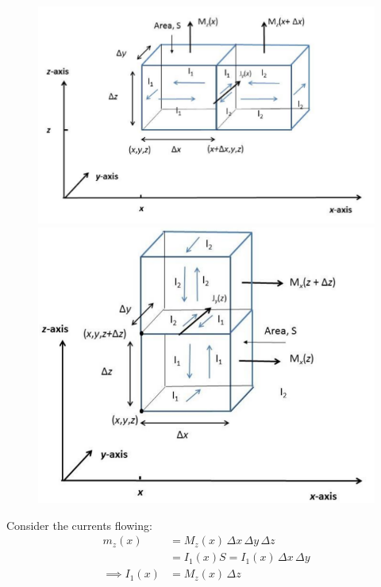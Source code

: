 \documentclass[a4paper, 11pt, normalem]{report}
\begin{document}
\begin{figure}[H]
	\centering
	\includegraphics[scale=0.4]{magbox1.png}
	\includegraphics[scale=0.3]{magbox2.png}
\end{figure}

Consider the currents flowing:
\begin{align}
    m_z(x) &= M_z(x)\,\Delta x\,\Delta y\,\Delta z \\
    &= I_1(x)S = I_1(x)\,\Delta x\,\Delta y \\
    \implies I_1(x) &= M_z(x)\,\Delta z
\end{align}
\end{document}
